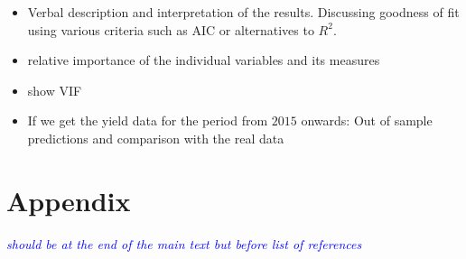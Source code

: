 \documentclass[12pt]{iopart}
\begin{document}
\begin{itemize}
\color{blue}
\item Verbal description and interpretation of the results. Discussing goodness of fit using various criteria such as AIC or alternatives to $R^2$.

\item relative importance of the individual variables and its measures

	
	
\item show VIF
\item If we get the yield data for the period from $2015$ onwards: Out of sample predictions and comparison with the real data
\end{itemize}





\color{black}

\clearpage

\appendix
\section*{Appendix}

\textcolor{blue}{\textit{should be at the end of the main text but before list of references}}
\end{document}
